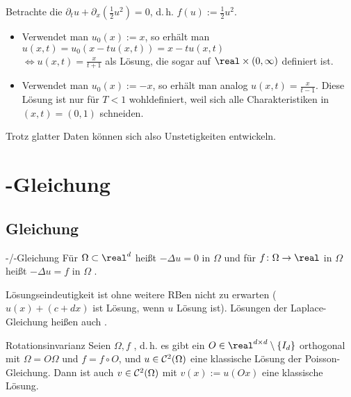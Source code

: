 \linie

\begin{Bsp}
    Betrachte die 
    $\partial_t u + \partial_x (\frac{1}{2} u^2) = 0$, d.\,h. $f(u) := \frac{1}{2} u^2$.
    \begin{itemize}
        \item
        Verwendet man $u_0(x) := x$, so erhält man
        $u(x, t) = u_0(x - t u(x, t)) = x - t u(x, t)$\\
        $\iff u(x, t) = \frac{x}{t + 1}$ als Lösung, die sogar auf $\real \times (0, \infty)$
        definiert ist.

        \item
        Verwendet man $u_0(x) := -x$, so erhält man analog $u(x, t) = \frac{x}{t - 1}$.
        Diese Lösung ist nur für $T < 1$ wohldefiniert, weil sich alle Charakteristiken in
        $(x, t) = (0, 1)$ schneiden.
    \end{itemize}
    Trotz glatter Daten können sich also Unstetigkeiten entwickeln.
\end{Bsp}

\pagebreak

\section{%
    -Gleichung%
}

\subsection{%
    Gleichung%
}

\begin{Def}{-/-Gleichung}
    Für $\Omega \subset \real^d$ heißt $-\Delta u = 0$ in $\Omega$
     und für $f\colon \Omega \to \real$ in $\Omega$ heißt
    $-\Delta u = f$ in $\Omega$ .
\end{Def}

\begin{Bem}
    Lösungseindeutigkeit ist ohne weitere RBen nicht zu erwarten
    ($u(x) + (c + dx)$ ist Lösung, wenn $u$ Lösung ist).
    Lösungen der Laplace-Gleichung heißen auch .
\end{Bem}

\linie

\begin{Satz}{Rotationsinvarianz}
    Seien $\Omega, f$ ,
    d.\,h. es gibt ein $O \in \real^{d \times d} \setminus \{I_d\}$ orthogonal mit
    $\Omega = O\Omega$ und $f = f \circ O$,
    und $u \in \mathcal{C}^2(\Omega)$ eine klassische Lösung der Poisson-Gleichung.
    Dann ist auch $v \in \mathcal{C}^2(\Omega)$ mit $v(x) := u(Ox)$ eine klassische Lösung.
\end{Satz}

